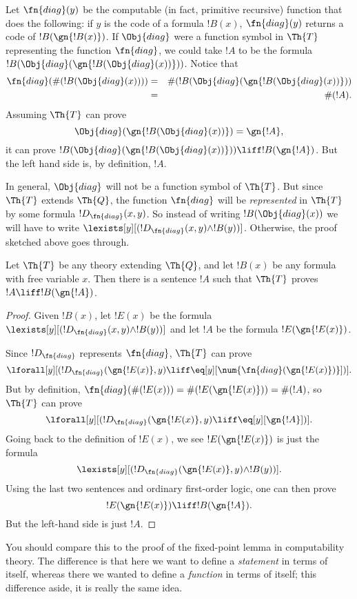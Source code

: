 \documentclass[../../include/open-logic-section]{subfiles}
\begin{document}


Let $\fn{diag}(y)$ be the computable (in fact, primitive recursive)
function that does the following: if $y$ is the code of a formula
$!B(x)$, $\fn{diag}(y)$ returns a code of $!B(\gn{!B(x)})$. If
$\Obj{diag}$ were a function symbol in $\Th{T}$ representing the
function $\fn{diag}$, we could take $!A$ to be the formula
$!B(\Obj{diag}(\gn{!B(\Obj{diag}(x))}))$. Notice that
\begin{eqnarray*}
\fn{diag}(\#(!B(\Obj{diag}(x)))) & = & 
\#(!B(\Obj{diag}(\gn{!B(\Obj{diag}(x))}))
\\
& = & \#(!A).
\end{eqnarray*}
Assuming $\Th{T}$ can prove
\[
\Obj{diag}(\gn{!B(\Obj{diag}(x))}) = \gn{!A},
\]
it can prove $!B(\Obj{diag}(\gn{!B(\Obj{diag}(x))}))
\liff !B(\gn{!A})$. But the left hand side is, by
definition, $!A$.

In general, $\Obj{diag}$ will not be a function symbol of
$\Th{T}$. But since $\Th{T}$ extends $\Th{Q}$, the function
$\fn{diag}$ will be {\em represented} in $\Th{T}$ by some formula
$!D_{\fn{diag}}(x,y)$. So instead of writing $!B(\Obj{diag}(x))$ we
will have to write $\lexists[y][(!D_{\fn{diag}}(x,y) \land
  !B(y))]$. Otherwise, the proof sketched above goes through.

\begin{lem}
  Let $\Th{T}$ be any theory extending $\Th{Q}$, and let $!B(x)$ be any
  formula with free variable $x$. Then there is a sentence $!A$ such
  that $\Th{T}$ proves $!A \liff !B(\gn{!A})$.
\end{lem}


\begin{proof}
Given $!B(x)$, let $!E(x)$ be the formula
$\lexists[y][(!D_{\fn{diag}}(x,y) \land !B(y))]$ and let $!A$ be the
formula $!E(\gn{!E(x)})$.

Since $!D_{\fn{diag}}$ represents $\fn{diag}$, $\Th{T}$ can prove
\[
\lforall[y][(!D_{\fn{diag}}(\gn{!E(x)},y) \liff
  \eq[y][\num{\fn{diag}(\gn{!E(x)})}])].
\]
But by definition, 
$\fn{diag}(\#(!E(x))) = \#(!E(\gn{!E(x)})) =
\#(!A)$, so $\Th{T}$ can prove
\[
\lforall[y][(!D_{\fn{diag}}(\gn{!E(x)},y) \liff \eq[y][\gn{!A}])].
\]
Going back to the definition of $!E(x)$, we see
$!E(\gn{!E(x)})$ is just the formula
\[
\lexists[y][(!D_{\fn{diag}}(\gn{!E(x)},y) \land !B(y))].
\]
Using the last two sentences and ordinary first-order logic, one can
then prove
\[
!E(\gn{!E(x)}) \liff !B(\gn{!A}).
\]
But the left-hand side is just $!A$. 
\end{proof}

\begin{digress}
You should compare this to the proof of the fixed-point lemma in
computability theory. The difference is that here we want to define a
{\em statement} in terms of itself, whereas there we wanted to define
a {\em function} in terms of itself; this difference aside, it is
really the same idea.
\end{digress}
\end{document}
